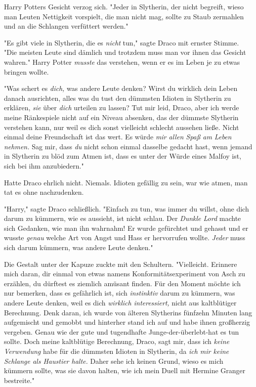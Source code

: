 {Harry Potters Gesicht verzog sich. "Jeder in Slytherin, der nicht begreift, wieso man Leuten Nettigkeit vorspielt, die man nicht mag, sollte zu Staub zermahlen und an die Schlangen verfüttert werden."

"Es gibt viele in Slytherin, die es \emph{nicht} tun," sagte Draco mit ernster Stimme. "Die meisten Leute sind dämlich und trotzdem muss man vor ihnen das Gesicht wahren." Harry Potter \emph{musste} das verstehen, wenn er es im Leben je zu etwas bringen wollte.

"Was schert es \emph{dich,} was andere Leute denken? Wirst du wirklich dein Leben danach ausrichten, alles was du tust den dümmsten Idioten in Slytherin zu erklären, \emph{sie} über \emph{dich} urteilen zu lassen? Tut mir leid, Draco, aber ich werde meine Ränkespiele nicht auf ein Niveau absenken, das der dümmste Slytherin verstehen kann, nur weil es dich sonst vielleicht schlecht aussehen ließe. Nicht einmal deine Freundschaft ist das wert. Es würde \emph{mir allen Spaß am Leben nehmen.} Sag mir, dass \emph{du} nicht schon einmal dasselbe gedacht hast, wenn jemand in Slytherin zu blöd zum Atmen ist, dass es unter der Würde eines Malfoy ist, sich bei ihm anzubiedern."

Hatte Draco ehrlich nicht. Niemals. Idioten gefällig zu sein, war wie atmen, man tat es ohne nachzudenken.

"Harry," sagte Draco schließlich. "Einfach zu tun, was immer du willst, ohne dich darum zu kümmern, wie es aussieht, ist nicht schlau. Der \emph{Dunkle Lord} machte sich Gedanken, wie man ihn wahrnahm! Er wurde gefürchtet und gehasst und er wusste \emph{genau} welche Art von Angst und Hass er hervorrufen wollte. \emph{Jeder} muss sich darum kümmern, was andere Leute denken."

Die Gestalt unter der Kapuze zuckte mit den Schultern. "Vielleicht. Erinnere mich daran, dir einmal von etwas namens Konformitätsexperiment von Asch zu erzählen, du dürftest es ziemlich amüsant finden. Für den Moment möchte ich nur bemerken, dass es gefährlich ist, sich \emph{instinktiv} darum zu kümmern, was andere Leute denken, weil es dich \emph{wirklich interessiert,} nicht aus kaltblütiger Berechnung. Denk daran, ich wurde von älteren Slytherins fünfzehn Minuten lang aufgemischt und gemobbt und hinterher stand ich auf und habe ihnen großherzig vergeben. Genau wie der gute und tugendhafte Junge-der-überlebt-hat es tun sollte. Doch meine kaltblütige Berechnung, Draco, sagt mir, dass ich \emph{keine Verwendung} habe für die dümmsten Idioten in Slytherin, da \emph{ich mir keine Schlange als Haustier halte.} Daher sehe ich keinen Grund, wieso es mich kümmern sollte, was sie davon halten, wie ich mein Duell mit Hermine Granger bestreite."

}
